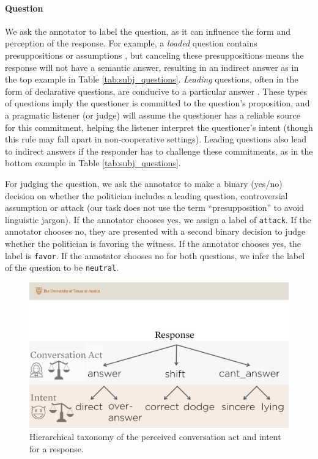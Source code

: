 \paragraph{Question}
We ask the annotator to label the question, as it can influence the form and perception of the response. For example, a \emph{loaded} question contains presuppositions or assumptions \cite{Walton:2003}, but canceling these presuppositions means the response will not have a semantic answer, resulting in an indirect answer \cite{Groenendijk:1984} as in the top example in Table \ref{tab:subj_questions}. \emph{Leading} questions, often in the form of declarative questions, are conducive to a particular answer \cite{Bolinger:1957}. These types of questions imply the questioner is committed to the question's proposition, and a pragmatic listener (or judge) will assume the questioner has a reliable source for this commitment, helping the listener interpret the questioner's intent \cite{Gunlogson:2008} (though this rule may fall apart in non-cooperative settings). Leading questions also lead to indirect answers if the responder has to challenge these commitments, as in the bottom example in Table \ref{tab:subj_questions}.

For judging the question, we ask the annotator to make a binary (yes/no) decision on whether the politician includes a leading question, controversial assumption or attack (our task does not use the term ``presupposition'' to avoid linguistic jargon). If the annotator chooses yes, we assign a label of \texttt{attack}. If the annotator chooses no, they are presented with a second binary decision to judge whether the politician is favoring the witness. If the annotator chooses yes, the label is \texttt{favor}. If the annotator chooses no for both questions, we infer the label of the question to be \texttt{neutral}. 

\begin{figure}[t]
\centering
\vspace{-1.0em}
\includegraphics[scale=0.12]{plots/response_taxonomy.pdf}
\vspace{-0.5em}
\caption{Hierarchical taxonomy of the perceived conversation act and intent for a response.}
\label{fig:response_taxonomy}
\end{figure}


